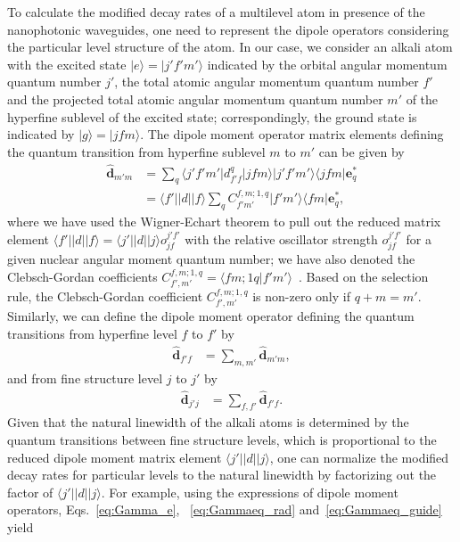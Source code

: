 \documentclass[preprint,aps,pra,onecolumn,superscriptaddress]{revtex4-1} %
\def\bra#1{\langle{#1}\rvert}%
\def\ket#1{\lvert{#1}\rangle}%
\begin{document}
\begin{appendix}
To calculate the modified decay rates of a multilevel atom in presence of the nanophotonic waveguides, one need to represent the dipole operators considering the particular level structure of the atom. 
In our case, we consider an alkali atom with the excited state $ \ket{e}=\ket{j'f'm'} $ indicated by the orbital angular momentum quantum number $ j' $, the total atomic angular momentum quantum number $ f' $ and the projected total atomic angular momentum quantum number $ m' $ of the hyperfine sublevel of the excited state; correspondingly, the ground state is indicated by $ \ket{g}=\ket{jfm} $. The dipole moment operator matrix elements defining the quantum transition from hyperfine sublevel $ m $ to $ m' $ can be given by
\begin{align}
\hat{\mathbf{d}}_{m'm} &= \sum_q \bra{j'f'm'}d_{f'f}^q\ket{jfm}\ket{j'f'm'}\bra{jfm}\mathbf{e}_q^*\\
&= \bra{f'}\vert d\vert\ket{f}\sum_q C_{f'm'}^{f,m;1,q}\ket{f'm'}\bra{fm}\mathbf{e}_q^*,
\end{align} 
where we have used the Wigner-Echart theorem to pull out the reduced matrix element $ \bra{f'}\vert d\vert\ket{f}=\bra{j'}\vert d\vert \ket{j}o_{jf}^{j'f'} $ with the relative oscillator strength $ o_{jf}^{j'f'} $ for a given nuclear angular moment quantum number; we have also denoted the Clebsch-Gordan coefficients $ C_{f',m'}^{f,m;1,q}=\bra{fm;1q}f'm'\rangle $~\cite{Deutsch2010a}.
Based on the selection rule, the Clebsch-Gordan coefficient $C_{f',m'}^{f,m;1,q}  $ is non-zero only if $ q+m=m' $.
Similarly, we can define the dipole moment operator defining the quantum transitions from hyperfine level $ f $ to $ f' $ by 
\begin{align}
\hat{\mathbf{d}}_{f'f} &= \sum_{m,m'} \hat{\mathbf{d}}_{m'm},
\end{align}
and from fine structure level $ j $ to $ j' $ by
\begin{align}
\hat{\mathbf{d}}_{j'j} &= \sum_{f,f'} \hat{\mathbf{d}}_{f'f}.
\end{align}
Given that the natural linewidth of the alkali atoms is determined by the quantum transitions between fine structure levels, which is proportional to the reduced dipole moment matrix element $ \bra{j'}\vert d\vert \ket{j} $, one can normalize the modified decay rates for particular levels to the natural linewidth by factorizing out the factor of $ \bra{j'}\vert d\vert \ket{j} $. For example, using the expressions of dipole moment operators, Eqs.~\eqref{eq:Gamma_e}, ~\eqref{eq:Gammaeq_rad} and~\eqref{eq:Gammaeq_guide} yield

\end{appendix}
\end{document}
